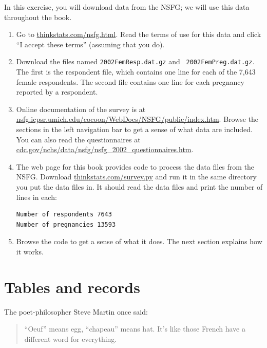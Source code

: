 \documentclass[12pt]{book}
\begin{document}
\begin{ex}

In this exercise, you will download data from the NSFG; we will use
this data throughout the book.

\begin{enumerate}

\item Go to \url{thinkstats.com/nsfg.html}.  Read the terms of
use for this data and click ``I accept these terms'' (assuming that you do).

\item Download the files named {\tt 2002FemResp.dat.gz} and {\tt
  2002FemPreg.dat.gz}.  The first is the respondent file, which contains
  one line for each of the 7,643 female respondents.
  The second file contains one line for each pregnancy reported by a
  respondent.

\item Online documentation of the survey is at
  \url{nsfg.icpsr.umich.edu/cocoon/WebDocs/NSFG/public/index.htm}.
  Browse the sections in the left navigation bar to get a sense of
  what data are included.  You can also read the questionnaires
  at \url{cdc.gov/nchs/data/nsfg/nsfg_2002_questionnaires.htm}.

\item The web page for this book provides code to process the data
  files from the NSFG.  Download \url{thinkstats.com/survey.py}
  and run it in the same directory you put the data files in.  It
  should read the data files and print the number of lines in each:

\begin{verbatim}
Number of respondents 7643
Number of pregnancies 13593
\end{verbatim}

\item Browse the code to get a sense of what it does.  The next
section explains how it works.

\end{enumerate}

\end{ex}

\section{Tables and records}

The poet-philosopher Steve Martin once said:

\begin{quote}
``Oeuf'' means egg, ``chapeau'' means hat.  It's like those French
  have a different word for everything.
\end{quote}
\end{document}
